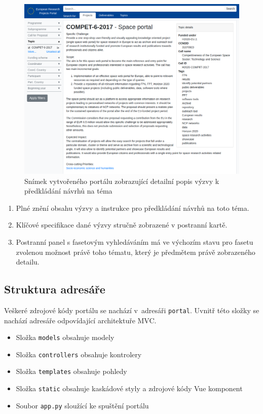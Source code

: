 \begin{figure}[H]
	\centering
	\includegraphics[width=\textwidth]{obrazky-figures/my-topic.png}
	\caption{Snímek vytvořeného portálu zobrazující detailní popis výzvy k předkládání návrhů na téma }
	\label{image:portal-detail}
\end{figure}
\begin{enumerate}
    \item Plné znění obsahu výzvy a instrukce pro předkládání návrhů na toto téma.
    \item Klíčové specifikace dané výzvy stručně zobrazené v postranní kartě.
    \item Postranní panel s fasetovým vyhledáváním má ve výchozím stavu pro fasetu  zvolenou možnost právě toho tématu, který je předmětem právě zobrazeného detailu.
\end{enumerate}

\blindtext[2]

\subsection{Struktura adresáře}
Veškeré zdrojové kódy portálu se nachází v~adresáři \texttt{portal}. Uvnitř této složky se nachází adresáře odpovídající architektuře MVC.
\begin{itemize}
  \item Složka \texttt{models} obsahuje modely
  \item Složka \texttt{controllers} obsahuje kontrolery
  \item Složka \texttt{templates} obsahuje pohledy
  \item Složka \texttt{static} obsahuje kaskádové styly a zdrojové kódy Vue komponent
  \item Soubor \texttt{app.py} sloužící ke spuštění portálu
\end{itemize}

